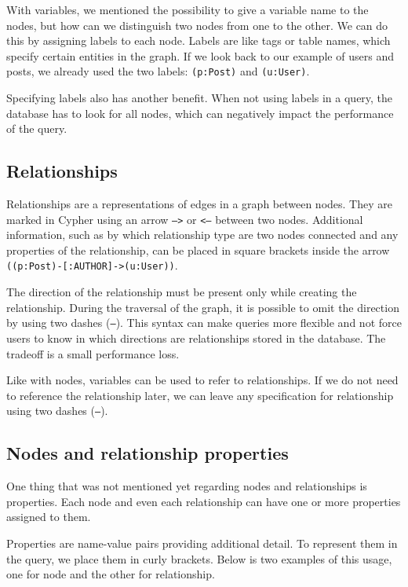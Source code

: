 With variables, we mentioned the possibility to give a variable name to the nodes, but how can we distinguish two nodes from one to the other.
We can do this by assigning labels to each node. Labels are like tags or table names, which specify certain entities in the graph.
If we look back to our example of users and posts, we already used the two labels: \texttt{(p:Post)} and \texttt{(u:User)}.

Specifying labels also has another benefit. When not using labels in a query, the database has to look for all nodes, which can negatively impact the performance of the query.
\cite{noauthor_getting_nodate}

\subsection{Relationships}

Relationships are a representations of edges in a graph between nodes.
They are marked in Cypher using an arrow \texttt{-->} or \texttt{<--} between two nodes.
Additional information, such as by which relationship type are two nodes connected and any properties of the relationship, can be placed in square brackets inside the arrow \texttt{((p:Post)-[:AUTHOR]->(u:User))}. \cite{noauthor_getting_nodate}

The direction of the relationship must be present only while creating the relationship.
During the traversal of the graph, it is possible to omit the direction by using two dashes (\texttt{--}).
This syntax can make queries more flexible and not force users to know in which directions are relationships stored in the database.
The tradeoff is a small performance loss.

Like with nodes, variables can be used to refer to relationships.
If we do not need to reference the relationship later, we can leave any specification for relationship using two dashes (\texttt{--}).

\subsection{Nodes and relationship properties}

One thing that was not mentioned yet regarding nodes and relationships is properties. Each node and even each relationship can have one or more properties assigned to them.

Properties are name-value pairs providing additional detail. To represent them in the query, we place them in curly brackets. \cite{noauthor_getting_nodate}
Below is two examples of this usage, one for node and the other for relationship.

